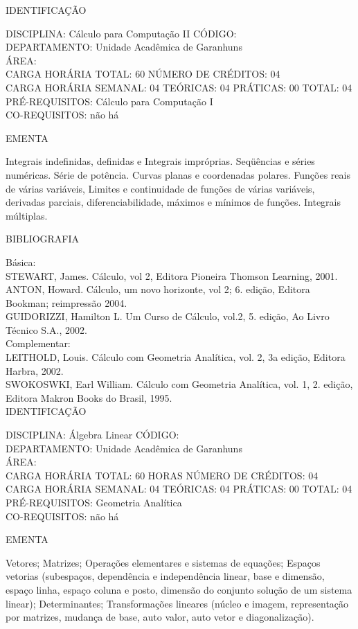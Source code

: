 \documentclass[
	12pt,				%
	openright,			%
  oneside,     %
	a4paper,			%
	english,			%
	french,				%
	spanish,			%
	brazil				%
	]{abntex2}
\begin{document}
\begin{apendicesenv}
IDENTIFICAÇÃO

DISCIPLINA: Cálculo para Computação II CÓDIGO:\\ 
DEPARTAMENTO: Unidade Acadêmica de Garanhuns\\
ÁREA: \\
CARGA HORÁRIA TOTAL: 60 NÚMERO DE CRÉDITOS: 04\\
CARGA HORÁRIA SEMANAL: 04 TEÓRICAS: 04 PRÁTICAS: 00 TOTAL: 04\\
PRÉ-REQUISITOS: Cálculo para Computação I\\
CO-REQUISITOS: não há

EMENTA 

Integrais indefinidas, definidas e Integrais impróprias. Seqüências e
séries numéricas. Série de potência. Curvas planas e coordenadas
polares. Funções reais de várias variáveis, Limites e continuidade de
funções de várias variáveis, derivadas parciais, diferenciabilidade,
máximos e mínimos de funções. Integrais múltiplas.

BIBLIOGRAFIA 

Básica: \\
STEWART, James. Cálculo, vol 2, Editora Pioneira Thomson Learning, 2001.\\
ANTON, Howard. Cálculo, um novo horizonte, vol 2; 6. edição, Editora
Bookman; reimpressão 2004.\\
GUIDORIZZI, Hamilton L. Um Curso de Cálculo, vol.2, 5. edição, Ao Livro
Técnico S.A., 2002.\\
Complementar:\\
LEITHOLD, Louis. Cálculo com Geometria Analítica, vol. 2, 3a edição,
Editora Harbra, 2002.\\
SWOKOSWKI, Earl William. Cálculo com Geometria Analítica, vol. 1, 2.
edição, Editora Makron Books do Brasil, 1995.\\


\newpage IDENTIFICAÇÃO

DISCIPLINA: Álgebra Linear CÓDIGO:\\ 
DEPARTAMENTO: Unidade Acadêmica de Garanhuns\\
ÁREA: \\
CARGA HORÁRIA TOTAL: 60 HORAS NÚMERO DE CRÉDITOS: 04\\
CARGA HORÁRIA SEMANAL: 04 TEÓRICAS: 04 PRÁTICAS: 00 TOTAL: 04\\
PRÉ-REQUISITOS: Geometria Analítica\\
CO-REQUISITOS: não há

EMENTA 

Vetores; Matrizes; Operações elementares e sistemas de equações; Espaços vetorias (subespaços, dependência e independência linear, base e
dimensão, espaço linha, espaço coluna e posto, dimensão do conjunto solução de um sistema linear); Determinantes; Transformações lineares
(núcleo e imagem, representação por matrizes, mudança de base, auto valor, auto vetor e diagonalização).


\end{apendicesenv}
\end{document}
